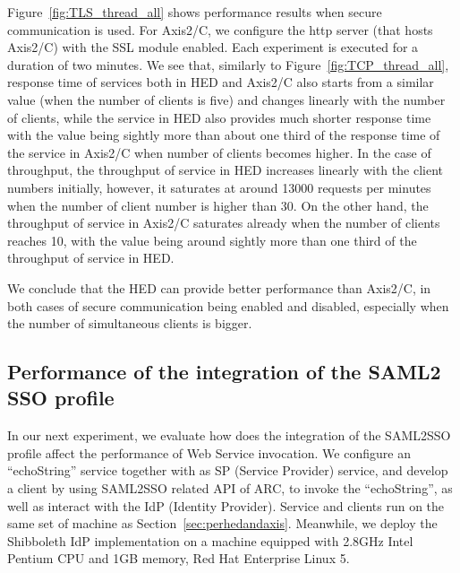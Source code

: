 \documentclass[conference]{IEEEtran}
\begin{document}
Figure~\ref{fig:TLS_thread_all} shows performance results when secure
communication is used. For Axis2/C, we configure the http server (that hosts Axis2/C) with the SSL
module enabled. Each experiment is executed for a duration of two minutes.
We see that, similarly to Figure~\ref{fig:TCP_thread_all}, response
time of services both in HED and Axis2/C also starts from a similar value (when the number of
clients is five) and changes linearly with the number of clients, while the service in HED also provides much shorter
response time with the value being sightly more than about one third of the response time of
the service in Axis2/C when  number of clients becomes higher.
In the case of throughput, the throughput of service in HED increases linearly
with the client numbers initially, however, it saturates at around 13000 requests per
minutes when the number  of client number is higher than 30. On the other hand, the throughput of service in
Axis2/C saturates already when the number of clients reaches 10, with
the value being around sightly more than one third of the throughput of service in HED.

We conclude that the HED can provide better performance than Axis2/C, in both
cases of secure communication being enabled and disabled, especially when the number of
simultaneous clients is bigger.

\subsection{Performance of the integration of the SAML2 SSO profile}
\label{sec:perfsaml2sso}
In our next experiment, we evaluate how does the integration of the SAML2SSO
profile affect the performance of Web Service invocation. We configure an ``echoString'' service
together with as SP (Service Provider) service, and develop a client by using
SAML2SSO related API of ARC, to invoke the ``echoString'', as well as interact with the IdP (Identity Provider).
Service and clients run on the same set of machine as Section~\ref{sec:perhedandaxis}. Meanwhile, we deploy
the Shibboleth IdP implementation on a machine equipped with 2.8GHz Intel Pentium CPU and 1GB
memory, Red Hat Enterprise Linux 5.
\end{document}

